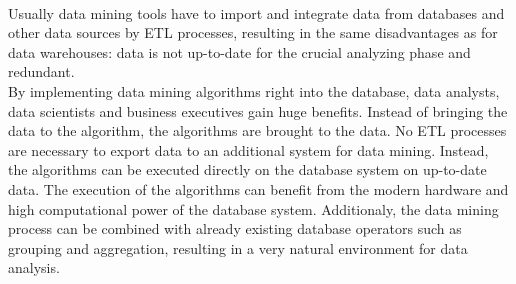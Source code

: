 \\
Usually data mining tools have to import and integrate data from databases and other data sources by ETL processes, resulting in the same disadvantages as for data warehouses: data is not up-to-date for the crucial analyzing phase and redundant. 
\\
By implementing data mining algorithms right into the database, data analysts, data scientists and business executives gain huge benefits. Instead of bringing the data to the algorithm, the algorithms are brought to the data. No ETL processes are necessary to export data to an additional system for data mining. Instead, the algorithms can be executed directly on the database system on up-to-date data. The execution of the algorithms can benefit from the modern hardware and high computational power of the database system. Additionaly, the data mining process can be combined with already existing database operators such as grouping and aggregation, resulting in a very natural environment for data analysis.


